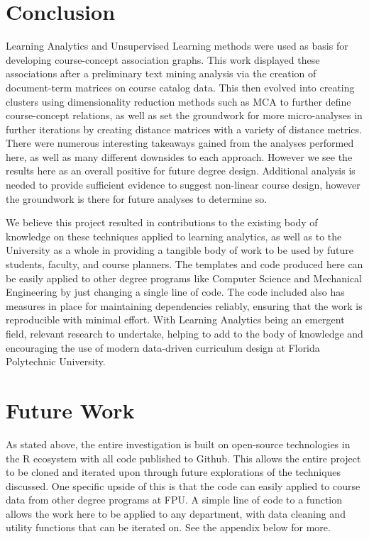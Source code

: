 \documentclass[11pt]{report}
\begin{document}
\section{Conclusion}


Learning Analytics and Unsupervised Learning methods were used as basis for developing course-concept association graphs. 
This work displayed these associations after a preliminary text mining analysis via the creation of document-term matrices 
on course catalog data.  This then evolved into creating clusters using dimensionality reduction methods such as MCA to 
further define course-concept relations, as well as set the groundwork for more  micro-analyses in further iterations by 
creating distance matrices with a variety of distance metrics.  There were numerous interesting takeaways gained from the 
analyses performed here, as well as many different downsides to each approach. However we see the results here as an 
overall positive for future degree design.  Additional analysis is needed to provide sufficient evidence to suggest 
non-linear course design,  however the groundwork is there for future analyses to determine so.

We believe this  project resulted in contributions to the existing body of knowledge on these techniques applied to 
learning analytics, as well as to the University as a whole in providing a tangible body of work to be used by future 
students, faculty, and course planners.   The templates and code produced here can be easily applied to other 
degree programs like Computer Science and Mechanical Engineering by just changing a single line of code. The code 
included also has measures in place for maintaining dependencies reliably,  ensuring that the work is reproducible 
with minimal effort. With Learning Analytics being an emergent field, relevant research to undertake, helping to add 
to the body of knowledge and encouraging the use of modern data-driven curriculum design at Florida Polytechnic University. 

\section{Future Work}
As stated above,  the entire investigation is built on open-source technologies in the R ecosystem with all code published 
to Github. This allows the entire project to be cloned and iterated upon through future explorations of the techniques 
discussed. One specific upside of this is that the code can easily applied to course data from other degree programs at FPU. A simple line of code to a function allows the work here to be applied to any department, with data cleaning and utility functions that can be iterated on. See the appendix below for more.
\end{document}
